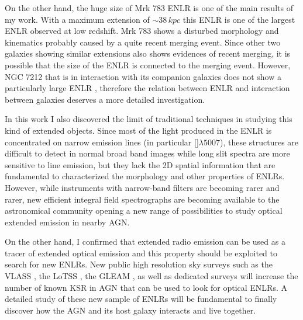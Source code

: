 \documentclass[../main.tex]{subfiles}
\begin{document}
On the other hand, the huge size of Mrk 783 ENLR is one of the main results of my work.
With a maximum extension of $\sim 38\,\si{kpc}$ this ENLR is one of the largest ENLR observed at low redshift.
Mrk 783 shows a disturbed morphology and kinematics probably caused by a quite recent merging event.
Since other two galaxies showing similar extensions \citep[UGC 7342 and NGC 5972][]{Keel12} also shows evidences of recent merging, it is possible that the size of the ENLR is connected to the merging event.
However, NGC 7212 that is in interaction with its companion galaxies does not show a particularly large ENLR \citep{Cracco11}, therefore the relation between ENLR and interaction between galaxies deserves a more detailed investigation.

In this work I also discovered the limit of traditional techniques in studying this kind of extended objects.
Since most of the light produced in the ENLR is concentrated on narrow emission lines (in particular []$\lambda5007$), these structures are difficult to detect in normal broad band images \citep[e.g.][]{Sun18} while long slit spectra are more sensitive to line emission, but they lack the 2D spatial information that are fundamental to characterized the morphology and other properties of ENLRs.
However, while instruments with narrow-band filters are becoming rarer and rarer, new efficient integral field spectrographs are becoming available to the astronomical community opening a new range of possibilities to study optical extended emission in nearby AGN.

On the other hand, I confirmed that extended radio emission can be used as a tracer of extended optical emission and this property should be exploited to search for new ENLRs.
New public high resolution sky surveys such as the VLASS \citep[VLA Sky Survey][]{Hales13}, the LoTSS \citep[LOFAR two meter sky survey][]{Shimwell17}, the GLEAM \citep[GaLactic and Extragalactic All-sky MWA Survey][]{Hurley17}, as well as dedicated surveys will increase the number of known KSR in AGN that can be used to look for optical ENLRs.
A detailed study of these new sample of ENLRs will be fundamental to finally discover how the AGN and its host galaxy interacts and live together.
\end{document}
